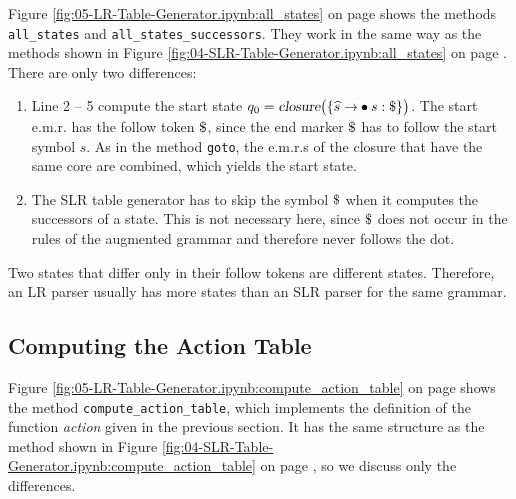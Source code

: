 \noindent
Figure \ref{fig:05-LR-Table-Generator.ipynb:all_states} on page \pageref{fig:05-LR-Table-Generator.ipynb:all_states}
shows the methods \texttt{all\_states} and \texttt{all\_states\_successors}.  They work in the same way as the methods
shown in Figure \ref{fig:04-SLR-Table-Generator.ipynb:all_states} on page
\pageref{fig:04-SLR-Table-Generator.ipynb:all_states}.  There are only two differences:
\begin{enumerate}
\item Line 2 -- 5 compute the start state
      $q_0 = \textsl{closure}\bigl(\{ \widehat{s} \rightarrow \mdot s: \symbol{36} \}\bigr)$.  The start e.m.r.\@
      has the follow token $\symbol{36}$, since the end marker $\symbol{36}$ has to follow the start symbol $s$.  As
      in the method \texttt{goto}, the e.m.r.s of the closure that have the same core are combined, which yields
      the start state.
\item The SLR table generator has to skip the symbol $\symbol{36}$ when it computes the successors of a state.  This
      is not necessary here, since $\symbol{36}$ does not occur in the rules of the augmented grammar and therefore
      never follows the dot.
\end{enumerate}
Two states that differ only in their follow tokens are different states.  Therefore, an LR parser usually has more
states than an SLR parser for the same grammar.

\subsection{Computing the Action Table}
Figure \ref{fig:05-LR-Table-Generator.ipynb:compute_action_table} on page
\pageref{fig:05-LR-Table-Generator.ipynb:compute_action_table} shows the method \texttt{compute\_action\_table}, which
implements the definition of the function \textsl{action} given in the previous section.  It has the same structure
as the method shown in Figure \ref{fig:04-SLR-Table-Generator.ipynb:compute_action_table} on page
\pageref{fig:04-SLR-Table-Generator.ipynb:compute_action_table}, so we discuss only the differences.

